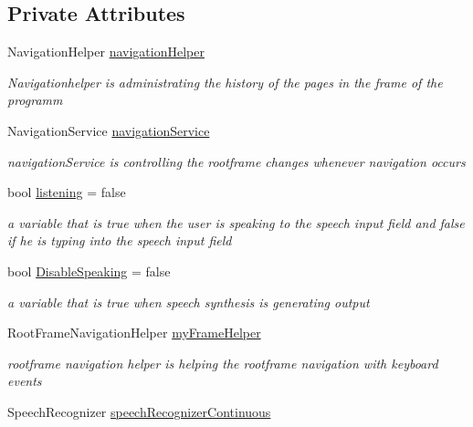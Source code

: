 \subsection*{Private Attributes}
\begin{DoxyCompactItemize}
\item 
Navigation\+Helper \mbox{\hyperlink{class_listen_to_me_1_1_main_page_a9ad9fdc2f7159cbe2d495645459cffe8}{navigation\+Helper}}
\begin{DoxyCompactList}\small\item\em Navigationhelper is administrating the history of the pages in the frame of the programm \end{DoxyCompactList}\item 
Navigation\+Service \mbox{\hyperlink{class_listen_to_me_1_1_main_page_aff60f67b7f65b20f4df33be26d015bcf}{navigation\+Service}}
\begin{DoxyCompactList}\small\item\em navigation\+Service is controlling the rootframe changes whenever navigation occurs \end{DoxyCompactList}\item 
bool \mbox{\hyperlink{class_listen_to_me_1_1_main_page_ad46f69d6d70b9b13b74b4013b86ca608}{listening}} = false
\begin{DoxyCompactList}\small\item\em a variable that is true when the user is speaking to the speech input field and false if he is typing into the speech input field \end{DoxyCompactList}\item 
bool \mbox{\hyperlink{class_listen_to_me_1_1_main_page_ad0705129e3c921457944d8c12f4c0d0a}{Disable\+Speaking}} = false
\begin{DoxyCompactList}\small\item\em a variable that is true when speech synthesis is generating output \end{DoxyCompactList}\item 
Root\+Frame\+Navigation\+Helper \mbox{\hyperlink{class_listen_to_me_1_1_main_page_a3185b88ec21f447708a2d3da983997e0}{my\+Frame\+Helper}}
\begin{DoxyCompactList}\small\item\em rootframe navigation helper is helping the rootframe navigation with keyboard events \end{DoxyCompactList}\item 
Speech\+Recognizer \mbox{\hyperlink{class_listen_to_me_1_1_main_page_ac417ca2ffe02d44895c029bf23e8f83a}{speech\+Recognizer\+Continuous}}

\end{DoxyCompactItemize}
